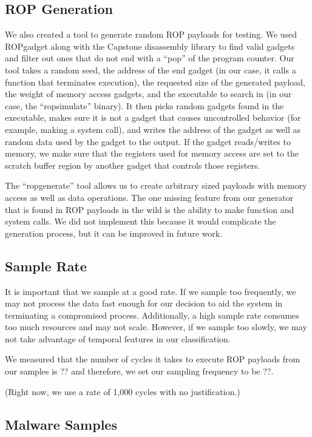\documentclass[letterpaper,twocolumn,10pt]{article}
\begin{document}
\subsection*{ROP Generation}

We also created a tool to generate random ROP payloads for testing. We used ROPgadget\cite{ROPgadget} along with the 
Capstone\cite{Capstone} disassembly library to find valid gadgets and filter out ones that do not end with a ``pop'' of 
the program counter. Our tool takes a random seed, the address of the end gadget (in our case, it calls a function 
that terminates execution), the requested size of the generated payload, the weight of memory access gadgets, and 
the executable to search in (in our case, the ``ropsimulate'' binary). It then picks random gadgets found in the 
executable, makes sure it is not a gadget that causes uncontrolled behavior (for example, making a system call), and 
writes the address of the gadget as well as random data used by the gadget to the output. If the gadget reads/writes 
to memory, we make sure that the registers used for memory access are set to the scratch buffer region by another 
gadget that controls those registers.

The ``ropgenerate'' tool allows us to create arbitrary sized payloads with memory access as well as data operations. 
The one missing feature from our generator that is found in ROP payloads in the wild is the ability to make function 
and system calls. We did not implement this because it would complicate the generation process, but it can be improved 
in future work.

\subsection*{Sample Rate}

It is important that we sample at a good rate. If we sample too frequently, we may not process 
the data fast enough for our decision to aid the system in terminating a compromised process. 
Additionally, a high sample rate consumes too much resources and may not scale. However, if 
we sample too slowly, we may not take advantage of temporal features in our classification.

We measured that the number of cycles it takes to execute ROP payloads from our samples 
is ?? and therefore, we set our sampling frequency to be ??.

(Right now, we use a rate of 1,000 cycles with no justification.)

\subsection*{Malware Samples}
\end{document}
